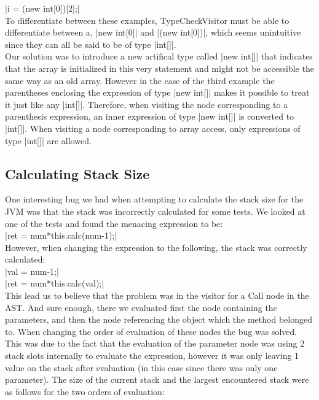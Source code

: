 \documentclass[paper=a4, fontsize=11pt]{scrartcl} %
\numberwithin{equation}{section} %
\numberwithin{figure}{section} %
\numberwithin{table}{section} %
\begin{document}
|i = (new int[0])[2];|\\

To differentiate between these examples, TypeCheckVisitor must be able to differentiate between a, |new int[0]| and |(new int[0])|, which seems unintuitive since they can all be said to be of type |int[]|.\\

Our solution was to introduce a new artifical type called |new int[]| that indicates that the array is initialized in this very statement and might not be accessible the same way as an old array.
However in the case of the third example the parentheses enclosing the expression of type |new int[]| makes it possible to treat it just like any |int[]|.
Therefore, when visiting the node corresponding to a parenthesis expression, an inner expression of type |new int[]| is converted to |int[]|.
When visiting a node corresponding to array access, only expressions of type |int[]| are allowed.

\subsection{Calculating Stack Size}

One interesting bug we had when attempting to calculate the stack size for the JVM was that the stack was incorrectly calculated for some tests.
We looked at one of the tests and found the menacing expression to be:\\

|ret = num*this.calc(num-1);|\\

However, when changing the expression to the following, the stack was correctly calculated:\\

|val = num-1;|\\
|ret = num*this.calc(val);|\\

This lead us to believe that the problem was in the visitor for a Call node in the AST.
And sure enough, there we evaluated first the node containing the parameters, and then the node referencing the object which the method belonged to.
When changing the order of evaluation of these nodes the bug was solved.
This was due to the fact that the evaluation of the parameter node was using 2 stack slots internally to evaluate the expression, however it was only leaving 1 value on the stack after evaluation (in this case since there was only one parameter).
The size of the current stack and the largest encountered stack were as follows for the two orders of evaluation:\\
\end{document}
